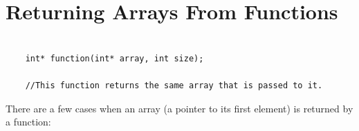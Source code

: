 \documentclass[12pt]{article}
\begin{document}
\newpage
{}
\section*{Returning Arrays From Functions}

\begin{verbatim}

    int* function(int* array, int size);
    
    //This function returns the same array that is passed to it.

\end{verbatim}

\vspace{1cm}

\noindent There are a few cases when an array (a pointer to its first element) is returned by a function: 
\end{document}
